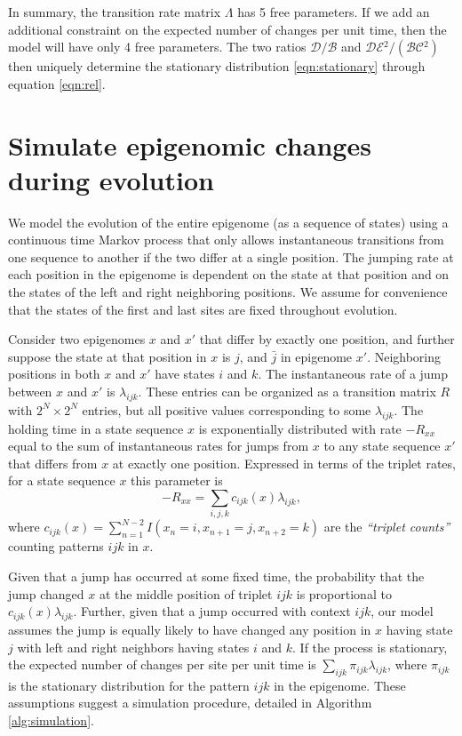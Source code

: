 \documentclass[11pt]{article}
\newcommand{\birth}{\ensuremath{\mathcal{B}}}
\newcommand{\death}{\ensuremath{\mathcal{D}}}
\newcommand{\expansion}{\ensuremath{\mathcal{E}}}
\newcommand{\contraction}{\ensuremath{\mathcal{C}}}
\begin{document}
In summary, the transition rate matrix $\Lambda$ has 5 free
parameters. If we add an additional constraint on the expected number
of changes per unit time, then the model will have only 4 free
parameters. The two ratios $\death{}/\birth{}$ and
$\death{}\expansion{}^2/(\birth{}\contraction{}^2)$ then uniquely
determine the stationary distribution \eqref{eqn:stationary} through
equation \eqref{eqn:rel}.

\section{Simulate epigenomic changes during evolution}


We model the evolution of the entire epigenome (as a sequence of
states) using a continuous time Markov process that only allows
instantaneous transitions from one sequence to another if the two
differ at a single position. The jumping rate at each position in the
epigenome is dependent on the state at that position and on the states
of the left and right neighboring positions. We assume for convenience
that the states of the first and last sites are fixed throughout
evolution.

Consider two epigenomes $x$ and $x'$ that differ by exactly one
position, and further suppose the state at that position in $x$ is
$j$, and $\bar{j}$ in epigenome $x'$. Neighboring positions in both
$x$ and $x'$ have states $i$ and $k$. The instantaneous rate of a jump
between $x$ and $x'$ is $\lambda_{ijk}$. These entries can be
organized as a transition matrix $R$ with $2^N\times 2^N$ entries, but
all positive values corresponding to some $\lambda_{ijk}$. The holding
time in a state sequence $x$ is exponentially distributed with rate
$-R_{xx}$ equal to the sum of instantaneous rates for jumps from $x$
to any state sequence $x'$ that differs from $x$ at exactly one
position. Expressed in terms of the triplet rates, for a state
sequence $x$ this parameter is
\[
-R_{xx} = \sum_{i,j,k}c_{ijk}(x)\lambda_{ijk},
\]
where $c_{ijk}(x) = \sum_{n=1}^{N-2}I(x_{n}=i, x_{n+1}=j, x_{n+2}=k)$
are the {\it ``triplet counts''} counting patterns $ijk$ in $x$.

Given that a jump has occurred at some fixed time, the probability
that the jump changed $x$ at the middle position of triplet $ijk$ is
proportional to $c_{ijk}(x)\lambda_{ijk}$. Further, given that a jump
occurred with context $ijk$, our model assumes the jump is equally
likely to have changed any position in $x$ having state $j$ with left
and right neighbors having states $i$ and $k$.
If the process is stationary, the expected number of changes per site
per unit time is
$\sum_{ijk}\pi_{ijk}\lambda_{ijk}$, where $\pi_{ijk}$ is the
stationary distribution for the pattern $ijk$ in the epigenome.
These assumptions suggest a simulation procedure, detailed in
Algorithm \ref{alg:simulation}.
\end{document}
